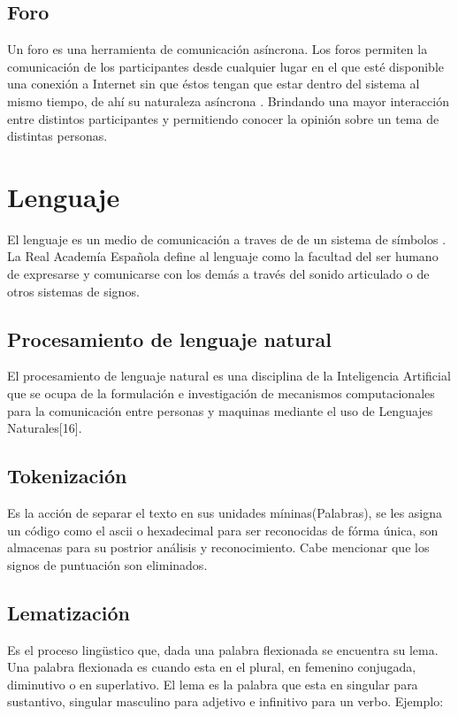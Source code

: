 \subsection{Foro}
Un foro es una herramienta de comunicación asíncrona. Los foros permiten la comunicación de los participantes desde cualquier lugar en el que  esté  disponible  una  conexión  a Internet  sin  que  éstos  tengan  que  estar dentro del sistema al mismo tiempo, de ahí su naturaleza asíncrona \cite{quince}. Brindando una mayor interacción entre distintos participantes y permitiendo conocer la opinión sobre un tema de distintas personas.


\section{Lenguaje}
El lenguaje es un medio de comunicación a traves de de un sistema de símbolos \cite{dieciseis}.
La Real Academía Española define al lenguaje como la facultad del ser humano de expresarse y comunicarse con los demás a través del sonido articulado o de otros sistemas de signos.

\subsection{Procesamiento de lenguaje natural}
El procesamiento de lenguaje natural es una disciplina de la Inteligencia Artificial que se ocupa de la formulación e investigación de mecanismos computacionales para la comunicación entre personas y maquinas mediante el uso de Lenguajes Naturales[16].

\subsection{Tokenización}


Es la acción de separar el texto en sus unidades míninas(Palabras), se les
asigna un código como el ascii o hexadecimal para ser reconocidas de fórma
única, son almacenas para su postrior análisis y reconocimiento. Cabe mencionar que los
signos de puntuación son eliminados.

\subsection{Lematización}

Es el proceso lingüstico que, dada una palabra flexionada se encuentra su
lema. Una palabra flexionada es cuando esta en el plural, en femenino conjugada,
diminutivo o en superlativo. El lema es la palabra que esta en singular para
sustantivo, singular masculino para adjetivo e infinitivo para un verbo. Ejemplo:

